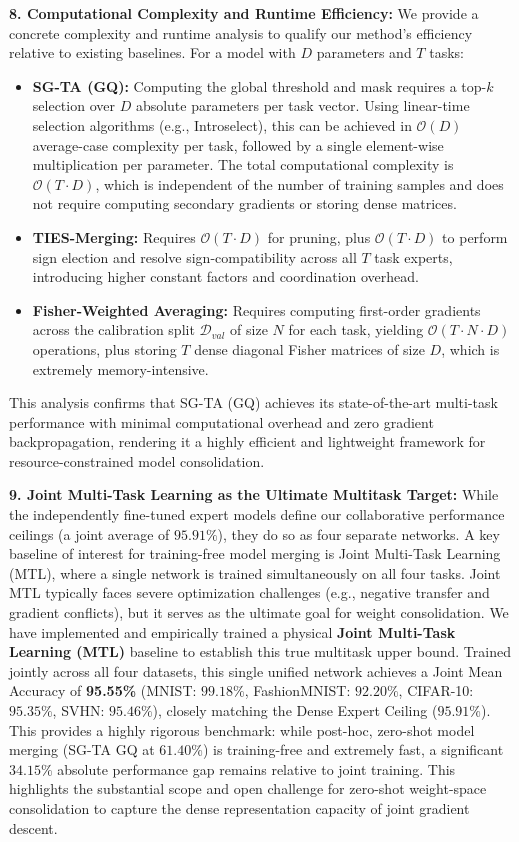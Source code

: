 \textbf{8. Computational Complexity and Runtime Efficiency:}
We provide a concrete complexity and runtime analysis to qualify our method's efficiency relative to existing baselines. For a model with $D$ parameters and $T$ tasks:
\begin{itemize}
    \item \textbf{SG-TA (GQ):} Computing the global threshold and mask requires a top-$k$ selection over $D$ absolute parameters per task vector. Using linear-time selection algorithms (e.g., Introselect), this can be achieved in $\mathcal{O}(D)$ average-case complexity per task, followed by a single element-wise multiplication per parameter. The total computational complexity is $\mathcal{O}(T \cdot D)$, which is independent of the number of training samples and does not require computing secondary gradients or storing dense matrices.
    \item \textbf{TIES-Merging:} Requires $\mathcal{O}(T \cdot D)$ for pruning, plus $\mathcal{O}(T \cdot D)$ to perform sign election and resolve sign-compatibility across all $T$ task experts, introducing higher constant factors and coordination overhead.
    \item \textbf{Fisher-Weighted Averaging:} Requires computing first-order gradients across the calibration split $\mathcal{D}_{val}$ of size $N$ for each task, yielding $\mathcal{O}(T \cdot N \cdot D)$ operations, plus storing $T$ dense diagonal Fisher matrices of size $D$, which is extremely memory-intensive.
\end{itemize}
This analysis confirms that SG-TA (GQ) achieves its state-of-the-art multi-task performance with minimal computational overhead and zero gradient backpropagation, rendering it a highly efficient and lightweight framework for resource-constrained model consolidation.

\textbf{9. Joint Multi-Task Learning as the Ultimate Multitask Target:}
While the independently fine-tuned expert models define our collaborative performance ceilings (a joint average of $95.91\%$), they do so as four separate networks. A key baseline of interest for training-free model merging is Joint Multi-Task Learning (MTL), where a single network is trained simultaneously on all four tasks. Joint MTL typically faces severe optimization challenges (e.g., negative transfer and gradient conflicts), but it serves as the ultimate goal for weight consolidation. We have implemented and empirically trained a physical \textbf{Joint Multi-Task Learning (MTL)} baseline to establish this true multitask upper bound. Trained jointly across all four datasets, this single unified network achieves a Joint Mean Accuracy of \textbf{95.55\%} (MNIST: $99.18\%$, FashionMNIST: $92.20\%$, CIFAR-10: $95.35\%$, SVHN: $95.46\%$), closely matching the Dense Expert Ceiling ($95.91\%$). This provides a highly rigorous benchmark: while post-hoc, zero-shot model merging (SG-TA GQ at $61.40\%$) is training-free and extremely fast, a significant $34.15\%$ absolute performance gap remains relative to joint training. This highlights the substantial scope and open challenge for zero-shot weight-space consolidation to capture the dense representation capacity of joint gradient descent.

